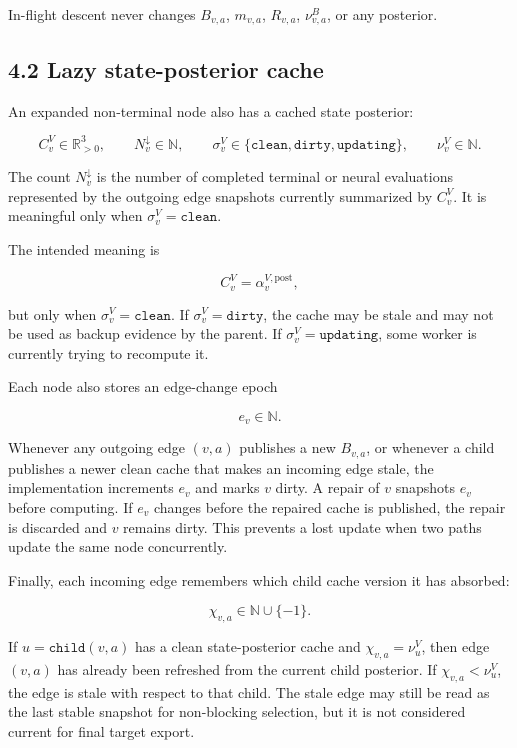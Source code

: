 \documentclass[11pt]{article}
\newcommand{\R}{\mathbb{R}}
\begin{document}
In-flight descent never changes \(B_{v,a}\), \(m_{v,a}\), \(R_{v,a}\),
\(\nu^B_{v,a}\), or any posterior.

\subsection*{4.2 Lazy state-posterior cache}

An expanded non-terminal node also has a cached state posterior:

\[
C^V_v\in\R_{>0}^3,
\qquad
N^\downarrow_v\in\mathbb{N},
\qquad
\sigma^V_v\in\{\texttt{clean},\texttt{dirty},\texttt{updating}\},
\qquad
\nu^V_v\in\mathbb{N}.
\]

The count \(N^\downarrow_v\) is the number of completed terminal or neural
evaluations represented by the outgoing edge snapshots currently summarized by
\(C^V_v\). It is meaningful only when \(\sigma^V_v=\texttt{clean}\).

The intended meaning is

\[
C^V_v = \alpha^{V,\mathrm{post}}_v,
\]

but only when \(\sigma^V_v=\texttt{clean}\). If
\(\sigma^V_v=\texttt{dirty}\), the cache may be stale and may not be used as
backup evidence by the parent. If \(\sigma^V_v=\texttt{updating}\), some worker
is currently trying to recompute it.

Each node also stores an edge-change epoch

\[
e_v\in\mathbb{N}.
\]

Whenever any outgoing edge \((v,a)\) publishes a new \(B_{v,a}\), or whenever a
child publishes a newer clean cache that makes an incoming edge stale, the
implementation increments \(e_v\) and marks \(v\) dirty. A repair of \(v\)
snapshots \(e_v\) before computing. If \(e_v\) changes before the repaired cache
is published, the repair is discarded and \(v\) remains dirty. This prevents a
lost update when two paths update the same node concurrently.

Finally, each incoming edge remembers which child cache version it has absorbed:

\[
\chi_{v,a}\in\mathbb{N}\cup\{-1\}.
\]

If \(u=\texttt{child}(v,a)\) has a clean state-posterior cache and
\(\chi_{v,a}=\nu^V_u\), then edge \((v,a)\) has already been refreshed from the
current child posterior. If \(\chi_{v,a}<\nu^V_u\), the edge is stale with respect
to that child. The stale edge may still be read as the last stable snapshot for
non-blocking selection, but it is not considered current for final target export.
\end{document}
